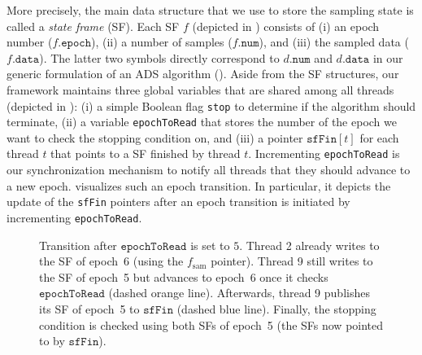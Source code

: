 More precisely, the main data structure that we use to store the sampling
state is called a \emph{state frame} (SF). Each SF $f$ (depicted
in ) consists of (i) an epoch number
($f.\mathtt{epoch}$), (ii) a number of samples ($f.\mathtt{num}$), and (iii)
the sampled data ($f.\mathtt{data}$).
The latter two symbols directly correspond to $d.\mathtt{num}$ and
$d.\mathtt{data}$ in our generic formulation of an ADS algorithm
().
%
Aside from the SF structures, our framework maintains three
global variables that are shared among all threads
(depicted in ): (i)
a simple Boolean flag \texttt{stop} to determine if
the algorithm should terminate, (ii) a variable
\texttt{epochToRead} that stores the number of the epoch
we want to check the stopping condition on, and (iii)
a pointer $\mathtt{sfFin}[t]$ for each thread $t$
that points to a SF finished by thread $t$.
%
Incrementing \texttt{epochToRead} is our synchronization
mechanism to notify all threads that they should advance to a new epoch.
 visualizes such an epoch transition.
In particular, it depicts the update of the \texttt{sfFin} pointers
after an epoch transition is initiated by incrementing
\texttt{epochToRead}.

\begin{figure}[t]
\centering

\caption{Transition after $\mathtt{epochToRead}$ is set to $5$. Thread 2 already
writes to the SF of epoch~6 (using the $f_\mathrm{sam}$ pointer).
Thread 9 still writes to the SF of epoch~5 but
advances to epoch~6 once it checks $\mathtt{epochToRead}$ (dashed orange line).
Afterwards, thread 9 publishes its SF of epoch~5 to $\mathtt{sfFin}$ (dashed blue line).
Finally, the stopping condition is checked using both SFs of epoch~5
(\ie the SFs now pointed to by $\mathtt{sfFin}$).}
\label{fig:betw-apx:epoch-advance}
\end{figure}



